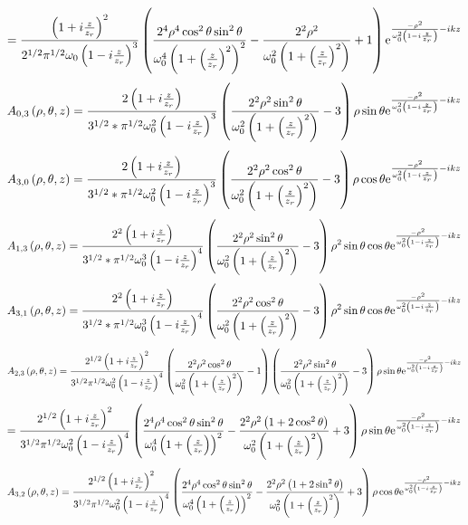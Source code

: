 \documentclass[11pt]{amsart}
\makeatletter
\newcommand{\e}{{\rm e}}				%
\newcommand{\0}{\varnothing}		%
\newcommand{\1}{!}
\newcommand{\2}{@}
\newcommand{\3}{\#}
\newcommand{\4}{\$}
\newcommand{\5}{\%}
\newcommand{\6}{$^\wedge$}
\newcommand{\7}{\&}
\newcommand{\8}{*}
\newcommand{\9}{(}
\makeatother
\begin{document}
\[
=\frac{\left(1+i\frac{z}{z_r}\right)^2}{2^{1/2}\pi^{1/2}\omega_0\left(1-i\frac{z}{z_r}\right)^3}\left(\frac{2^4\rho^4\cos^2\theta\sin^2\theta}{\omega_0^4\left(1+\left(\frac{z}{z_r}\right)^2\right)^2}-\frac{2^2\rho^2}{\omega_0^2\left(1+\left(\frac{z}{z_r}\right)^2\right)}+1\right)\e^{\frac{-\rho^2}{\omega_0^2\left(1-i\frac{z}{z_r}\right)}-ikz}
\]
\[
A_{0,3}\left(\rho,\theta,z\right) =\frac{2\left(1+i\frac{z}{z_r}\right)}{3^{1/2}*\pi^{1/2}\omega_0^2\left(1-i\frac{z}{z_r}\right)^3}\left(\frac{2^2\rho^2\sin^2\theta}{\omega_0^2\left(1+\left(\frac{z}{z_r}\right)^2\right)}-3\right)\rho\sin\theta\e^{\frac{-\rho^2}{\omega_0^2\left(1-i\frac{z}{z_r}\right)}-ikz}
\]
\[
A_{3,0}\left(\rho,\theta,z\right) =\frac{2\left(1+i\frac{z}{z_r}\right)}{3^{1/2}*\pi^{1/2}\omega_0^2\left(1-i\frac{z}{z_r}\right)^3}\left(\frac{2^2\rho^2\cos^2\theta}{\omega_0^2\left(1+\left(\frac{z}{z_r}\right)^2\right)}-3\right)\rho\cos\theta\e^{\frac{-\rho^2}{\omega_0^2\left(1-i\frac{z}{z_r}\right)}-ikz}
\]
\[
A_{1,3} \left(\rho,\theta,z\right) =\frac{2^2\left(1+i\frac{z}{z_r}\right)}{3^{1/2}*\pi^{1/2}\omega_0^3\left(1-i\frac{z}{z_r}\right)^4}\left(\frac{2^2\rho^2\sin^2\theta}{\omega_0^2\left(1+\left(\frac{z}{z_r}\right)^2\right)}-3\right)\rho^2\sin\theta\cos\theta \e^{\frac{-\rho^2}{\omega_0^2\left(1-i\frac{z}{z_r}\right)}-ikz}
\]
\[
A_{3,1} \left(\rho,\theta,z\right) =\frac{2^2\left(1+i\frac{z}{z_r}\right)}{3^{1/2}*\pi^{1/2}\omega_0^3\left(1-i\frac{z}{z_r}\right)^4}\left(\frac{2^2\rho^2\cos^2\theta}{\omega_0^2\left(1+\left(\frac{z}{z_r}\right)^2\right)}-3\right)\rho^2\sin\theta\cos\theta \e^{\frac{-\rho^2}{\omega_0^2\left(1-i\frac{z}{z_r}\right)}-ikz}
\]
\[
A_{2,3}\left(\rho,\theta,z\right) = \frac{2^{1/2}\left(1+i\frac{z}{z_r}\right)^2}{3^{1/2}\pi^{1/2}\omega_0^2\left(1-i\frac{z}{z_r}\right)^4}\left(\frac{2^2\rho^2\cos^2\theta}{\omega_0^2\left(1+\left(\frac{z}{z_r}\right)^2\right)}-1\right)\left(\frac{2^2\rho^2\sin^2\theta}{\omega_0^2\left(1+\left(\frac{z}{z_r}\right)^2\right)}-3\right)\rho\sin\theta\e^{\frac{-\rho^2}{\omega_0^2\left(1-i\frac{z}{z_r}\right)}-ikz}
\]
\[
= \frac{2^{1/2}\left(1+i\frac{z}{z_r}\right)^2}{3^{1/2}\pi^{1/2}\omega_0^2\left(1-i\frac{z}{z_r}\right)^4}\left(\frac{2^4\rho^4\cos^2\theta\sin^2\theta}{\omega_0^4\left(1+\left(\frac{z}{z_r}\right)\right)^2}-\frac{2^2\rho^2\left(1+2\cos^2\theta\right)}{\omega_0^2\left(1+\left(\frac{z}{z_r}\right)^2\right)}+3\right)\rho\sin\theta\e^{\frac{-\rho^2}{\omega_0^2\left(1-i\frac{z}{z_r}\right)}-ikz}
\]
\[
A_{3,2}\left(\rho,\theta,z\right) = \frac{2^{1/2}\left(1+i\frac{z}{z_r}\right)^2}{3^{1/2}\pi^{1/2}\omega_0^2\left(1-i\frac{z}{z_r}\right)^4}\left(\frac{2^4\rho^4\cos^2\theta\sin^2\theta}{\omega_0^4\left(1+\left(\frac{z}{z_r}\right)\right)^2}-\frac{2^2\rho^2\left(1+2\sin^2\theta\right)}{\omega_0^2\left(1+\left(\frac{z}{z_r}\right)^2\right)}+3\right)\rho\cos\theta\e^{\frac{-\rho^2}{\omega_0^2\left(1-i\frac{z}{z_r}\right)}-ikz}
\]
\end{document}
